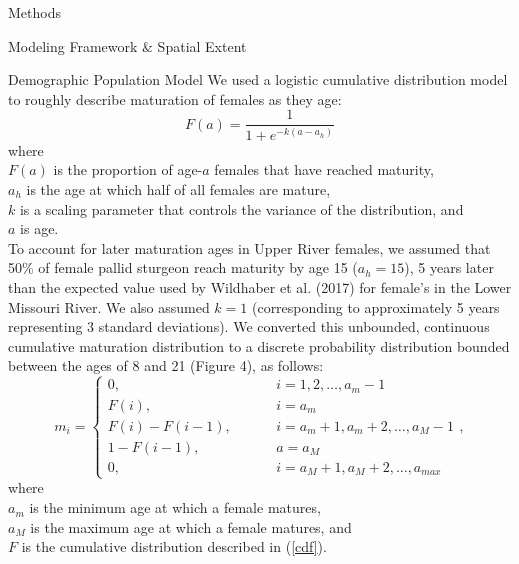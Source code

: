 \documentclass[12pt]{article}
\begin{document}
\begin{section}{Methods}
\begin{subsection}{Modeling Framework \& Spatial Extent}
\begin{subsubsection}{Demographic Population Model}
We used a logistic cumulative distribution model to roughly describe maturation of females as they age:
\begin{equation}
F(a)=\frac{1}{1+e^{-k(a-a_h)}}
\label{cdf}
\end{equation}  
where\\
\hspace*{0.5cm}$F(a)$ is the proportion of age-$a$ females that have reached maturity,\\
\hspace*{0.5cm}$a_h$ is the age at which half of all females are mature,\\ 
\hspace*{0.5cm}$k$ is a scaling parameter that controls the variance of the distribution, and\\
\hspace*{0.5cm}$a$ is age.\\

To account for later maturation ages in Upper River females, we assumed that 50\% of female pallid sturgeon reach maturity by age 15 ($a_h=15$), 5 years later than the expected value used by Wildhaber et al. (2017) for female's in the Lower Missouri River.  We also assumed $k=1$ (corresponding to approximately 5 years representing 3 standard deviations).  We converted this unbounded, continuous cumulative maturation distribution to a discrete probability distribution bounded between the ages of 8 and 21 (Figure 4), as follows: 
\begin{equation}
m_i = \begin{cases}
0, & \hspace{1cm} i=1, 2, \dots, a_m-1\\
F(i), & \hspace{1cm} i=a_m\\
F(i)-F(i-1), & \hspace{1cm} i=a_m+1, a_m+2, \ldots, a_M-1\\
1-F(i-1), & \hspace{1cm} a=a_M\\
0, & \hspace{1cm} i=a_M+1, a_M+2, \ldots, a_{max}
\end{cases},
\label{mi}
\end{equation} 
where\\
\hspace*{0.5cm}$a_m$ is the minimum age at which a female matures,\\
\hspace*{0.5cm}$a_M$ is the maximum age at which a female matures, and\\ 
\hspace*{0.5cm}$F$ is the cumulative distribution described in (\ref{cdf}).\\ 



\end{subsubsection}
\end{subsection}
\end{section}
\end{document}
